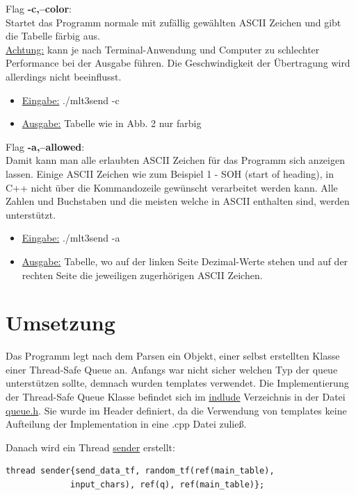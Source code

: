 \documentclass{article}
\begin{document}
Flag \textbf{-c,--color}:\\
Startet das Programm normale mit zufällig gewählten ASCII Zeichen und gibt die Tabelle färbig aus.\\
\underline{Achtung:} kann je nach Terminal-Anwendung und Computer zu schlechter Performance bei der Ausgabe führen. Die Geschwindigkeit der Übertragung wird
allerdings nicht beeinflusst.

\begin{itemize}
	\item \underline{Eingabe:} ./mlt3send -c
	\item \underline{Ausgabe:} Tabelle wie in Abb. 2 nur farbig\\
\end{itemize}

Flag \textbf{-a,--allowed}:\\
Damit kann man alle erlaubten ASCII Zeichen für das Programm sich anzeigen lassen. Einige ASCII Zeichen wie zum Beispiel 1 - SOH (start of heading), in C++ nicht über die
Kommandozeile gewünscht verarbeitet werden kann. Alle Zahlen und Buchstaben und die meisten welche in ASCII enthalten sind, werden unterstützt.

\begin{itemize}
	\item \underline{Eingabe:} ./mlt3send -a
	\item \underline{Ausgabe:} Tabelle, wo auf der linken Seite Dezimal-Werte stehen und auf der rechten Seite die jeweiligen zugerhörigen ASCII Zeichen.\\
\end{itemize}

\section{Umsetzung}
Das Programm legt nach dem Parsen ein Objekt, einer selbst erstellten Klasse einer Thread-Safe Queue an. Anfangs war nicht sicher welchen Typ der queue unterstützen sollte,
demnach wurden templates verwendet. Die Implementierung der Thread-Safe Queue Klasse befindet sich im \underline{indlude} Verzeichnis in der Datei \underline{queue.h}. Sie
wurde im Header definiert, da die Verwendung von templates keine Aufteilung der Implementation in eine .cpp Datei zuließ.

Danach wird ein Thread \underline{sender} erstellt:
\begin{lstlisting}
thread sender{send_data_tf, random_tf(ref(main_table),
		     input_chars), ref(q), ref(main_table)};
\end{lstlisting}
\end{document}
